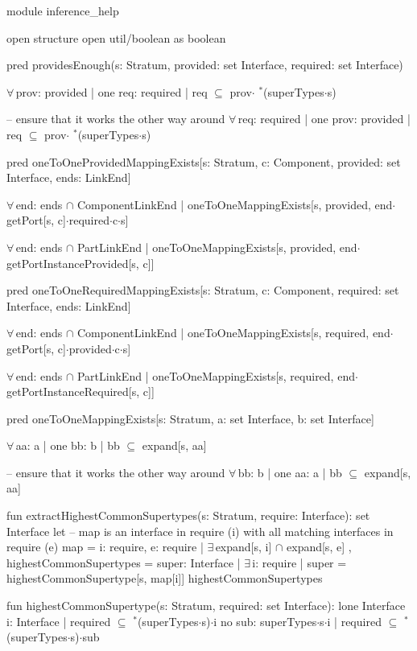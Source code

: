 module inference_help

open structure
open util/boolean as boolean


pred providesEnough(s: Stratum, provided: set Interface, required: set Interface)
{
  $\forall\,$prov: provided |
    one req: required |
      req $\subseteq$ prov$\cdot$ $\!\!\!^\ast\!$(superTypes$\cdot$s)
      
  -- ensure that it works the other way around
  $\forall\,$req: required |
    one prov: provided |
      req $\subseteq$ prov$\cdot$ $\!\!\!^\ast\!$(superTypes$\cdot$s)
}

pred oneToOneProvidedMappingExists[s: Stratum, c: Component, provided: set Interface, ends: LinkEnd]
{
  $\forall\,$end: ends $\cap$ ComponentLinkEnd |
    oneToOneMappingExists[s, provided, end$\cdot$getPort[s, c]$\cdot$required$\cdot$c$\cdot$s]

  $\forall\,$end: ends $\cap$ PartLinkEnd |
    oneToOneMappingExists[s, provided, end$\cdot$getPortInstanceProvided[s, c]]
}

pred oneToOneRequiredMappingExists[s: Stratum, c: Component, required: set Interface, ends: LinkEnd]
{
  $\forall\,$end: ends $\cap$ ComponentLinkEnd |
    oneToOneMappingExists[s, required, end$\cdot$getPort[s, c]$\cdot$provided$\cdot$c$\cdot$s]

  $\forall\,$end: ends $\cap$ PartLinkEnd |
    oneToOneMappingExists[s, required, end$\cdot$getPortInstanceRequired[s, c]]
}

pred oneToOneMappingExists[s: Stratum, a: set Interface, b: set Interface]
{
  $\forall\,$aa: a |
    one bb: b |
      bb $\subseteq$ expand[s, aa]
      
  -- ensure that it works the other way around
  $\forall\,$bb: b |
    one aa: a |
      bb $\subseteq$ expand[s, aa]
}

fun extractHighestCommonSupertypes(s: Stratum, require: Interface): set Interface
{
  let
    -- map is an interface in require (i) with all matching interfaces in require (e)
    map =
    { i: require, e: require |
      $\exists\,$expand[s, i] $\cap$ expand[s, e] },
    highestCommonSupertypes =
    {
      super: Interface |
        $\exists\,$i: require |
          super = highestCommonSupertype[s, map[i]]
    }
  {
    highestCommonSupertypes
  }
}

fun highestCommonSupertype(s: Stratum, required: set Interface): lone Interface
{
  { i: Interface |
    {
      required $\subseteq$  $\!\!\!^\ast\!$(superTypes$\cdot$s)$\cdot$i
      no sub: superTypes$\cdot$s$\cdot$i |
        required $\subseteq$  $\!\!\!^\ast\!$(superTypes$\cdot$s)$\cdot$sub
    }
  }
}

